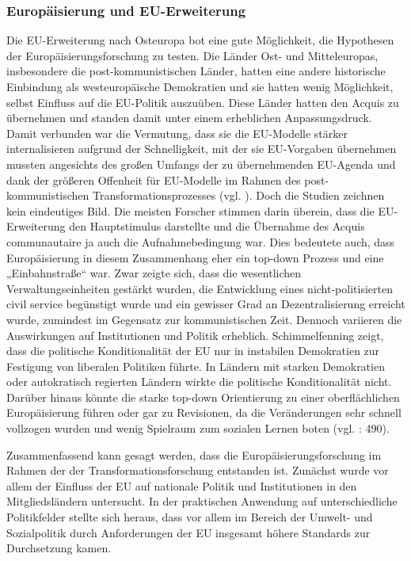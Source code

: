 \subsubsection{Europäisierung und EU-Erweiterung }
Die EU-Erweiterung nach Osteuropa bot eine gute Möglichkeit, die Hypothesen der Europäisierungsforschung zu testen. Die Länder Ost- und Mitteleuropas, insbesondere die post-kommunistischen Länder, hatten eine andere historische Einbindung als westeuropäische Demokratien und sie hatten wenig Möglichkeit, selbst Einfluss auf die EU-Politik auszuüben. Diese Länder hatten den Acquis zu übernehmen und standen damit unter einem erheblichen Anpassungsdruck. Damit verbunden war die Vermutung, dass sie die EU-Modelle stärker internalisieren aufgrund der Schnelligkeit, mit der sie EU-Vorgaben übernehmen mussten angesichts des großen Umfangs der zu übernehmenden EU-Agenda und dank der größeren Offenheit für EU-Modelle im Rahmen des post-kommunistischen Transformationsprozesses (vgl. \cite{grab03}). Doch die Studien zeichnen kein eindeutiges Bild. Die meisten Forscher stimmen darin überein, dass die EU-Erweiterung den Hauptstimulus darstellte und die Übernahme des Acquis communautaire ja auch die Aufnahmebedingung war. Dies bedeutete auch, dass Europäisierung in diesem Zusammenhang eher ein top-down Prozess und eine „Einbahnstraße“ war. Zwar zeigte sich, dass die wesentlichen Verwaltungseinheiten gestärkt wurden, die Entwicklung eines nicht-politisierten civil service begünstigt wurde und ein gewisser Grad an Dezentralisierung erreicht wurde, zumindest im Gegensatz zur kommunistischen Zeit. Dennoch variieren die Auswirkungen auf Institutionen und Politik erheblich. Schimmelfenning zeigt, dass die politische Konditionalität der EU nur in instabilen Demokratien zur Festigung von liberalen Politiken führte. In Ländern mit starken Demokratien oder autokratisch regierten Ländern wirkte die politische Konditionalität nicht. Darüber hinaus könnte die starke top-down Orientierung zu einer oberflächlichen Europäisierung führen oder gar zu Revisionen, da die Veränderungen sehr schnell vollzogen wurden und wenig Spielraum zum sozialen Lernen boten (vgl. \cite{boeris07}: 490).\par
Zusammenfassend kann gesagt werden, dass die Europäisierungsforschung im Rahmen der der Transformationsforschung entstanden ist. Zunächst wurde vor allem der Einfluss der EU auf nationale Politik und Institutionen in den Mitgliedsländern untersucht. In der praktischen Anwendung auf unterschiedliche Politikfelder stellte sich heraus, dass vor allem im Bereich der Umwelt- und Sozialpolitik durch Anforderungen der EU insgesamt höhere Standards zur Durchsetzung kamen.
